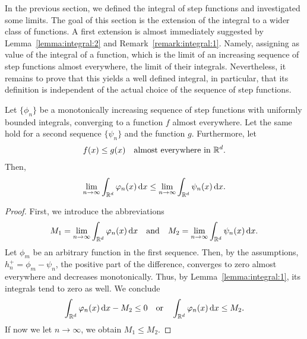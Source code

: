 \begin{intro}
  In the previous section, we defined the integral of step functions
  and investigated some limits. The goal of this section is the
  extension of the integral to a wider class of functions. A first
  extension is almost immediately suggested by
  Lemma~\ref{lemma:integral:2} and
  Remark~\ref{remark:integral:1}. Namely, assigning as value of the
  integral of a function, which is the limit of an increasing sequence
  of step functions almost everywhere, the limit of their
  integrals. Nevertheless, it remains to prove that this yields a well
  defined integral, in particular, that its definition is independent
  of the actual choice of the sequence of step functions.
\end{intro}

\begin{lemma}
  Let $\{\phi_n\}$ be a monotonically increasing sequence of step
  functions with uniformly bounded integrals, converging to a function
  $f$ almost everywhere. Let the same hold for a second sequence
  $\{\psi_n\}$ and the function $g$. Furthermore, let
  \begin{gather*}
    f(x) \le g(x) \quad\text{almost everywhere in $\mathbb R^d$.}
  \end{gather*}
  Then,
  \begin{gather}
    \label{eq:integral:4}
    \lim_{n\to\infty} \int_{\mathbb R^d}\varphi_n(x)\,\mathrm{d} x
    \le
    \lim_{n\to\infty} \int_{\mathbb R^d}\psi_n(x)\,\mathrm{d} x.
  \end{gather}
\end{lemma}

\begin{proof}
  First, we introduce the abbreviations
  \begin{gather*}
    M_1 = \lim_{n\to\infty} \int_{\mathbb R^d}\varphi_n(x)\,\mathrm{d} x
    \quad\text{and}\quad
    M_2 = \lim_{n\to\infty} \int_{\mathbb R^d}\psi_n(x)\,\mathrm{d} x.
  \end{gather*}
  Let $\phi_m$ be an arbitrary function in the first sequence. Then,
  by the assumptions, $h_n^+ = \phi_m-\psi_n$, the positive part of
  the difference, converges to zero almost everywhere and decreases
  monotonically. Thus, by Lemma~\ref{lemma:integral:1}, its integrals
  tend to zero as well. We conclude
  \begin{gather*}
    \int_{\mathbb R^d}\varphi_n(x)\,\mathrm{d} x - M_2 \le 0
    \quad\text{or}\quad
    \int_{\mathbb R^d}\varphi_n(x)\,\mathrm{d} x \le M_2.
  \end{gather*}
  If now we let $n\to\infty$, we obtain $M_1 \le M_2$.
\end{proof}

